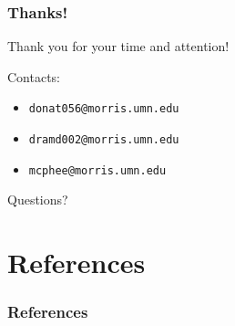 \documentclass{beamer}
\newcommand{\linespace}{\vskip 0.25cm}
\begin{document}
\begin{frame}
	\frametitle{Thanks!}
	
	Thank you for your time and attention!
		
	\linespace
	\linespace
	
	Contacts:  
	\begin{itemize}
		\item \texttt{donat056@morris.umn.edu}
		\item \texttt{dramd002@morris.umn.edu}
		\item \texttt{mcphee@morris.umn.edu}
	\end{itemize}
	
	\linespace
	\linespace
	
	\begin{center}
	{\huge Questions?}
	\end{center}
\end{frame}

\section*{References}

\begin{frame} 
\frametitle{References} 


\end{frame} 
\end{document}
